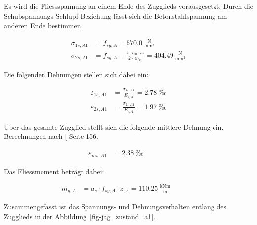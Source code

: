 \documentclass[
  11pt,
  letterpaper,
]{scrreprt}
\begin{document}
Es wird die Fliessspannung an einem Ende des Zugglieds vorausgesetzt.
Durch die Schubspannungs-Schlupf-Beziehung lässt sich die
Betonstahlspannung am anderen Ende bestimmen.

\[
\begin{aligned}
\sigma_{1 s , A1}& = f_{sy , A} = 570.0 \ \frac{\mathrm{N}}{\mathrm{mm}^{2}} \\ 
\sigma_{2 s , A1}& = f_{sy , A} - \frac{4 \cdot \tau_{b0} \cdot s_{r}}{2 \cdot \oslash_{x}} = 404.49 \ \frac{\mathrm{N}}{\mathrm{mm}^{2}} \end{aligned}
\]

Die folgenden Dehnungen stellen sich dabei ein:

\[
\begin{aligned}
\varepsilon_{1 s , A1}& = \frac{\sigma_{1 s , A1}}{E_{s , A}} = 2.78 \ \mathrm{‰} \\ 
\varepsilon_{2 s , A1}& = \frac{\sigma_{2 s , A1}}{E_{s , A}} = 1.97 \ \mathrm{‰} \end{aligned}
\]

Über das gesamte Zugglied stellt sich die folgende mittlere Dehnung ein.
Berechnungen nach {[}\citeproc{ref-marti_tragverhalten_1999}{8}{]} Seite
156.

\[
\begin{aligned}
\varepsilon_{m s , A1}& = 2.38 \ \mathrm{‰} \quad &  \quad &  
 \end{aligned}
\]

Das Fliessmoment beträgt dabei:

\[
\begin{aligned}
m_{y , A}& = a_{s} \cdot f_{sy , A} \cdot z_{, A} = 110.25 \ \frac{\mathrm{kNm}}{\mathrm{m}} \quad &  \quad &  
 \end{aligned}
\]

Zusammengefasst ist das Spannungs- und Dehnungsverhalten entlang des
Zugglieds in der Abbildung~\ref{fig-jag_zustand_a1}.
\end{document}
